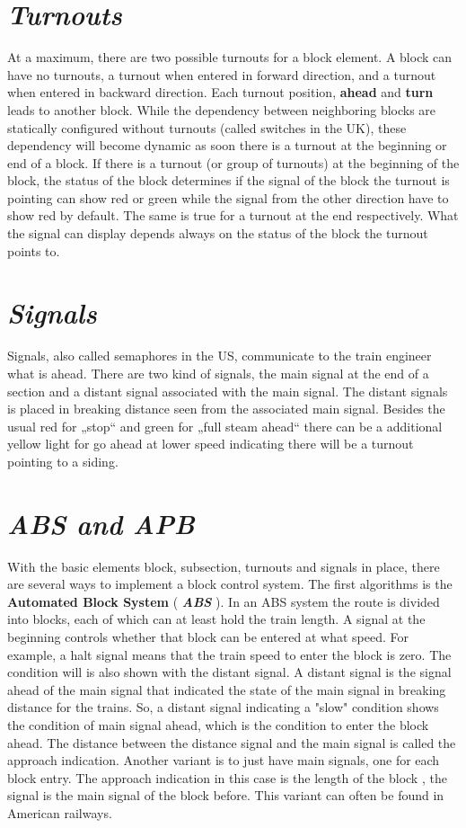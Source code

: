 \section{\textit{Turnouts}}

At a maximum, there are two possible turnouts for a block element. A block can have no turnouts, a turnout when entered in forward direction, and a turnout when entered in backward direction. Each turnout position, \textbf{ahead} and \textbf{turn} leads to another block. While the dependency between neighboring blocks are statically configured without turnouts (called switches in the UK), these dependency will become dynamic as soon there is a turnout at the beginning or end of a block. If there is a turnout (or group of turnouts) at the beginning of the block, the status of the block determines if the signal of the block the turnout is pointing can show red or green while the signal from the other direction have to show red by default. The same is true for a turnout at the end respectively. What the signal can display depends always on the status of the block the turnout points to.

\section{\textit{Signals}}

Signals, also called semaphores in the US, communicate to the train engineer what is ahead. There are two kind of signals, the main signal at the end of a section and a distant signal associated with the main signal. The distant signals is placed in breaking distance seen from the associated main signal. Besides the usual red for „stop“ and green for „full steam ahead“ there can be a additional yellow light for go ahead at lower speed indicating there will be a turnout pointing to a siding.

\section{\textit{ABS and APB}}

With the basic elements  block, subsection, turnouts and signals in place, there are several ways to implement a block control system. The first algorithms is the \textbf{Automated Block System} ( \textbf{\textit{ABS}} ). In an ABS system the route is divided into blocks, each of which can at least hold the train length. A signal at the beginning controls whether that block can be entered at what speed. For example, a halt signal means that the train speed to enter the block is zero. The condition will is also shown with the distant signal. A distant signal is the signal ahead of the main signal that indicated the state of the main signal in breaking distance for the trains. So, a distant signal indicating a "slow" condition shows the condition of main signal ahead, which is the condition to enter the block ahead. The distance between the distance signal and the main signal is called the approach indication. Another variant is to just have main signals, one for each block entry. The approach indication in this case is the length of the block , the signal is the main signal of the block before. This variant can often be found in American railways.

